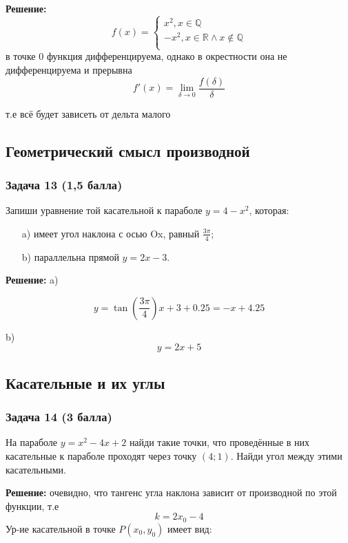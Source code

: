 \documentclass[a4paper,12pt]{article}
\begin{document}
\textbf{Решение:}
\[
f(x) = \begin{cases}
    x^2, x \in \mathbb{Q}\\
    -x^2, x \in \mathbb{R} \land x \not \in \mathbb{Q} \\
\end{cases}
\]
в точке 0 функция дифференцируема, однако в окрестности она не дифференцируема и прерывна
\[
f'(x) = \lim_{\delta \to 0} \frac{f(\delta)}{\delta}
\]

т.е всё будет зависеть от дельта малого

\vspace{1cm}

\subsection{Геометрический смысл производной}

\subsubsection{Задача 13 (1,5 балла)}
Запиши уравнение той касательной к параболе \( y = 4 - x^2 \), которая:
\begin{enumerate}
    \item[a)] имеет угол наклона с осью Ox, равный \( \frac{3\pi}{4} \);
    \item[b)] параллельна прямой \( y = 2x - 3 \).
\end{enumerate}

\textbf{Решение:}
a)

\[
y=\tan(\frac{3\pi}{4})x+3+0.25 = -x+4.25
\]

b)
\[
y=2x+5
\]
\vspace{1cm}

\subsection{Касательные и их углы}

\subsubsection{Задача 14 (3 балла)}
На параболе \( y = x^2 - 4x + 2 \) найди такие точки, что проведённые в них касательные к параболе проходят через точку \( (4; 1) \). Найди угол между этими касательными.

\textbf{Решение:}
очевидно, что тангенс угла наклона зависит от производной по этой функции, т.е 
\[
k = 2x_0-4
\]
Ур-ие касательной в точке $P(x_0, y_0)$ имеет вид: 
\end{document}
